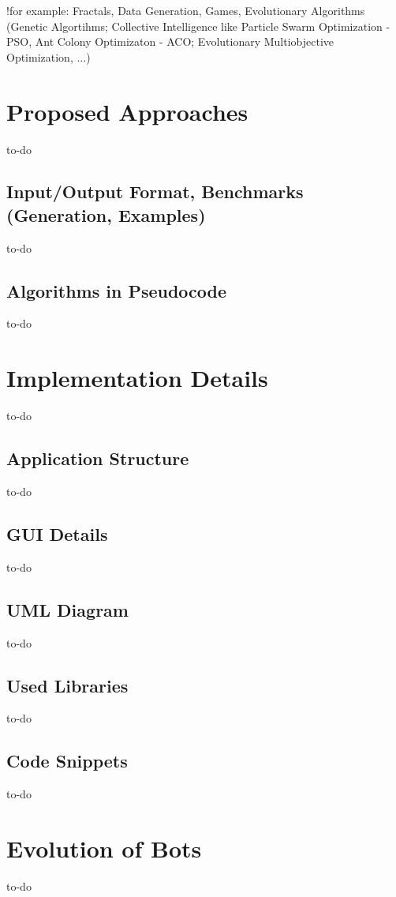 \documentclass[a4paper,12pt]{article}
\begin{document}
!for example: Fractals, Data Generation, Games, Evolutionary Algorithms (Genetic Algortihms; Collective Intelligence like Particle Swarm Optimization - PSO, Ant Colony Optimizaton - ACO; Evolutionary Multiobjective Optimization, ...)

\section{Proposed Approaches}
to-do
\subsection{Input/Output Format, Benchmarks (Generation, Examples)}
to-do
\subsection{Algorithms in Pseudocode}
to-do

\section{Implementation Details}
to-do
\subsection{Application Structure}
to-do
\subsection{GUI Details}
to-do
\subsection{UML Diagram}
to-do
\subsection{Used Libraries}
to-do
\subsection{Code Snippets}
to-do
\section{Evolution of Bots}
to-do
\end{document}
